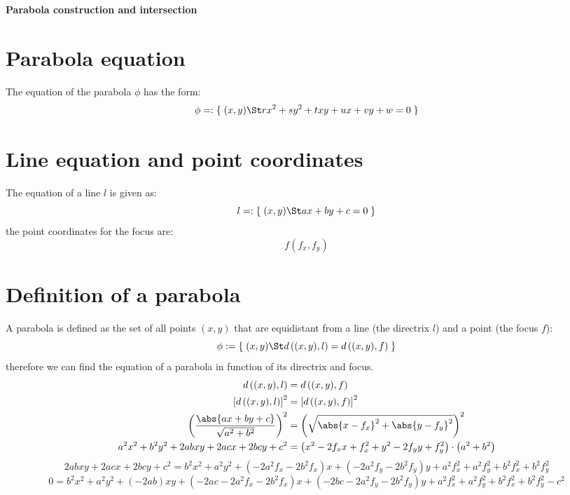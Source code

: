 \documentclass[11pt,a4paper,english]{article}
\begin{document}
    {\centering\huge\textbf{Parabola construction and intersection}\par}

    \vspace{1cm}

    \section*{Parabola equation}
    The equation of the parabola \(\phi\) has the form:
    \[
    	\phi =: \{\;(x,y) \St rx^{2} + sy^{2} + txy + ux + vy + w = 0\;\}
    \]

    \section*{Line equation and point coordinates}
    The equation of a line \(l\) is given as:
    \[
    	l =: \{\;(x,y) \St ax + by + c = 0\;\}
    \]
    the point coordinates for the focus are:
    \[
    	f(f_{x},f_{y})
    \]

    \section*{Definition of a parabola}
    A parabola is defined as the set of all points \((x,y)\) that are equidistant from a line (the directrix \(l\)) and a point (the focus \(f\)):
    \[
    	\phi := \{\;(x,y) \St d\left((x,y),l\right) = d\left((x,y),f\right)\;\}
    \]
    therefore we can find the equation of a parabola in function of its directrix and focus.
    \begin{align*}
    d\left((x,y),l\right) &= d\left((x,y),f\right) \\
	\left[d\left((x,y),l\right)\right]^2 &= \left[d\left((x,y),f\right)\right]^2 \\
	\left(\frac{\abs{ax + by + c}}{\sqrt{a^{2} + b^{2}}}\right)^{2} &= \left(\sqrt{\abs{x - f_{x}}^{2} + \abs{y - f_{y}}^{2}}\right)^{2} \\
	a^{2}x^{2} + b^{2}y^{2} + 2abxy + 2acx + 2bcy + c^{2} &= \left(x^{2} - 2f_{x}x + f_{x}^{2} + y^{2} - 2f_{y}y + f_{y}^{2}\right) \cdot \left(a^{2} + b^{2}\right)
	\end{align*}
	\[
		2abxy + 2acx + 2bcy + c^{2} = b^{2}x^{2} + a^{2}y^{2} + (-2a^{2}f_{x}-2b^{2}f_{x})x + (-2a^{2}f_{y}-2b^{2}f_{y})y + a^{2}f_{x}^{2} + a^{2}f_{y}^{2} + b^{2}f_{x}^{2} + b^{2}f_{y}^{2}
	\]
	\[
		0 = b^{2}x^{2} + a^{2}y^{2} + (-2ab)xy + (-2ac-2a^{2}f_{x}-2b^{2}f_{x})x + (-2bc-2a^{2}f_{y}-2b^{2}f_{y})y + a^{2}f_{x}^{2} + a^{2}f_{y}^{2} + b^{2}f_{x}^{2} + b^{2}f_{y}^{2} - c^{2}
	\]
	\ppar\bigskip
\end{document}
